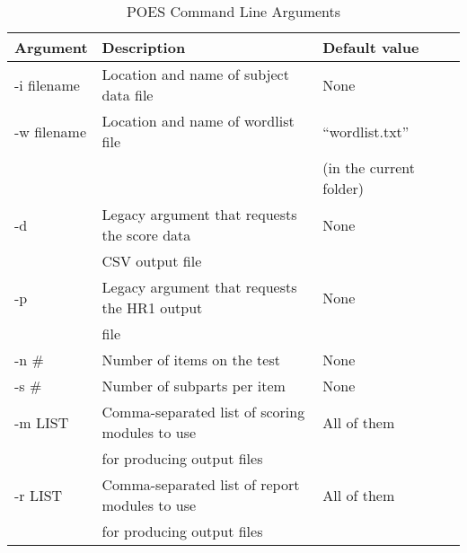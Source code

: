\documentclass[11pt]{article}
\numberwithin{figure}{section}
\numberwithin{table}{section}
\begin{document}
 
\begin{table}[htdp]
\caption{POES Command Line Arguments}
\begin{center}
\small
\begin{tabular}{|l|l|l|l|}
\hline
Argument 	&  Description												&  Default value\\
\hline
-i filename	& Location and name of subject data file							& None\\
-w filename	& Location and name of wordlist file							& ``wordlist.txt'' \\
&& (in the current folder)\\
-d 			& Legacy argument that requests the score data						& None\\
&  CSV output file &\\
-p 			& Legacy argument that requests the HR1 output					& None\\
&  file &\\
-n \#			& Number of items on the test									& None\\
-s \#			& Number of subparts per item									& None\\
-m LIST		& Comma-separated list of scoring modules to use						&	All of them\\
& for producing output files &\\
-r LIST		& Comma-separated list of report modules to use							&	All of them\\
& for producing output files &\\
\hline
\end{tabular}
\end{center}
\label{tab:poesclarg}
\end{table}%
\end{document}
